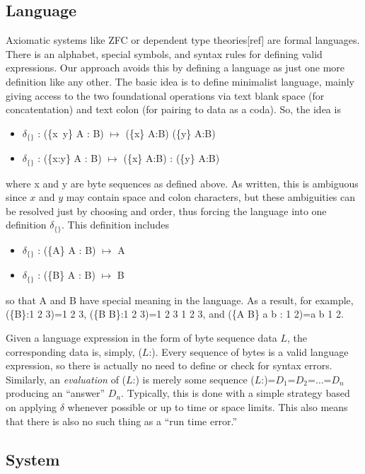 \documentclass[11pt]{article}
\begin{document}
\subsection{Language} 

Axiomatic systems like ZFC\cite{ZFC} or dependent type theories[ref] are formal languages.  There is an alphabet, special symbols, and syntax rules 
for defining valid expressions.  Our approach avoids this by defining a language as just one more definition like any other.  The basic idea is to 
define minimalist language, mainly giving access to the two foundational operations via text blank space (for concatentation) and text colon (for pairing to data as a coda).  So, the idea is 
\begin{itemize}
\item {$\delta_{\{\}}$ : (\{x\ y\} A : B) $\mapsto$ (\{x\} A:B) (\{y\} A:B)}
\item {$\delta_{\{\}}$ : (\{x:y\} A : B) $\mapsto$ (\{x\} A:B) : (\{y\} A:B)}
\end{itemize}
where x and y are byte sequences as defined above.  As written, this is ambiguous since $x$ and $y$ may contain space and colon characters, but 
these ambiguities can be resolved just by choosing and order, thus forcing the language into one definition 
$\delta_{\{\}}$.  This definition includes 
\begin{itemize}
\item {$\delta_{\{\}}$ : (\{A\} A : B) $\mapsto$ A}
\item {$\delta_{\{\}}$ : (\{B\} A : B) $\mapsto$ B}
\end{itemize}
so that A and B have special meaning in the language.  As a result, for example, (\{B\}:1 2 3)=1 2 3, (\{B B\}:1 2 3)=1 2 3 1 2 3, and (\{A B\} a b : 1 2)=a b 1 2.  

     Given a language expression in the form of byte sequence data $L$, the corresponding data is, simply, ($L$:).  Every sequence of bytes is a valid language 
expression, so there is actually no need to define or check for syntax errors.  Similarly, an {\it evaluation} of ($L$:) is merely some sequence 
($L$:)=$D_1$=$D_2$=$\dots$=$D_n$ producing an ``answer'' $D_n$.  Typically, this is done with a simple strategy based on applying $\delta$ whenever 
possible or up to time or space limits.  This also means that there is also no such thing as a ``run time error.''    

\subsection{System} 
\end{document}
